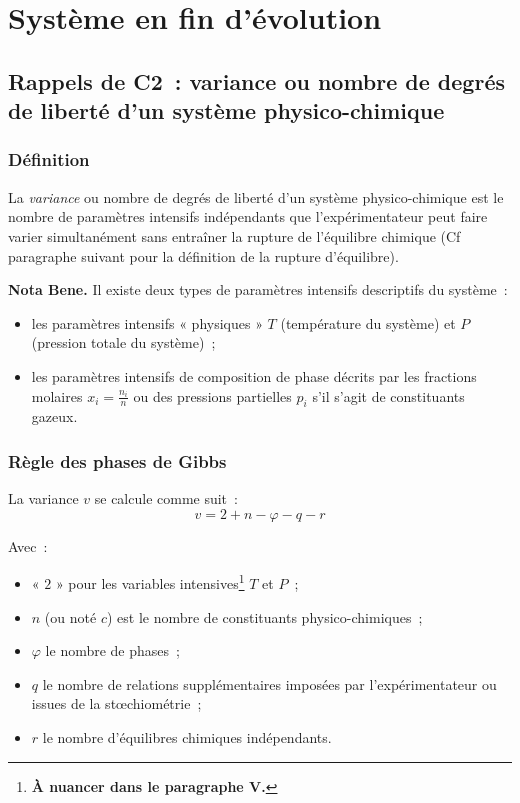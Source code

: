 \documentclass{article}
\begin{document}
\section{Système en fin d’évolution}
\subsection{Rappels de C2~: variance ou nombre de degrés de liberté d’un système physico-chimique}
\subsubsection{Définition}
\begin{enonce}
    La \textit{variance} ou nombre de degrés de liberté d’un système physico-chimique est le nombre de paramètres intensifs indépendants que l’expérimentateur peut faire varier simultanément sans entraîner la rupture de l’équilibre chimique (Cf paragraphe suivant pour la définition de la rupture d’équilibre).
\end{enonce}

\textbf{Nota Bene.} Il existe deux types de paramètres intensifs descriptifs du système~:
\begin{itemize}
    \item les paramètres intensifs « physiques » $T$ (température du système) et $P$ (pression totale du système)~;
    \item les paramètres intensifs de composition de phase décrits par les fractions molaires $x_i=\frac{n_i}{n}$ ou des pressions partielles $p_i$ s'il s'agit de constituants gazeux.
\end{itemize}

\subsubsection{Règle des phases de Gibbs}
\begin{enonce}
    La variance $v$ se calcule comme suit~:
    $$v=2+n-\varphi-q-r$$
\end{enonce}
Avec~:
\begin{itemize}
    \item « $2$ » pour les variables intensives\footnote{\textbf{À nuancer dans le paragraphe \textsc{V.}}} $T$ et $P$~;
    \item $n$ (ou noté $c$) est le nombre de constituants physico-chimiques~;
    \item $\varphi$ le nombre de phases~;
    \item $q$ le nombre de relations supplémentaires imposées par l'expérimentateur ou issues de la stœchiométrie~;
    \item $r$ le nombre d'équilibres chimiques indépendants.
\end{itemize}
\end{document}
